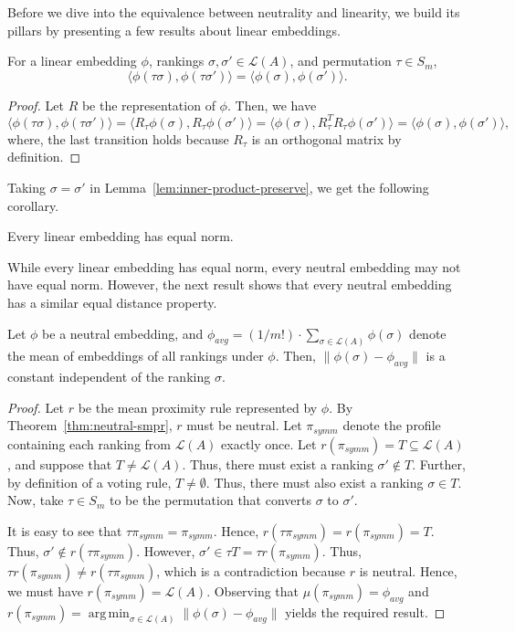 \documentclass[prodmode,acmec]{ec-acmsmall}
\newcommand{\calL}{{\mathcal{L}}}
\newcommand{\rank}{{\calL(A)}}
\DeclareMathOperator*{\argmin}{arg\,min}
\begin{document}
Before we dive into the equivalence between neutrality and linearity, we build its pillars by presenting a few results about linear embeddings. 
\begin{lemma}
For a linear embedding $\phi$, rankings $\sigma,\sigma' \in \rank$, and permutation $\tau \in S_m$, 
$$
\langle \phi(\tau \sigma), \phi(\tau \sigma') \rangle = \langle \phi(\sigma), \phi(\sigma') \rangle.
$$
\label{lem:inner-product-preserve}
\end{lemma}
\begin{proof}
Let $R$ be the representation of $\phi$. Then, we have 
\begin{equation}
\langle \phi(\tau \sigma), \phi(\tau \sigma') \rangle = \langle R_{\tau}\phi(\sigma), R_{\tau}\phi(\sigma') \rangle = \langle \phi(\sigma), R_{\tau}^T R_{\tau}\phi(\sigma') \rangle = \langle \phi(\sigma), \phi(\sigma') \rangle,
\label{eqn:linear-inner-product}
\end{equation}
where, the last transition holds because $R_{\tau}$ is an orthogonal matrix by definition. 
\end{proof}

Taking $\sigma = \sigma'$ in Lemma~\ref{lem:inner-product-preserve}, we get the following corollary.
\begin{corollary}
Every linear embedding has equal norm.
\label{cor:linear-equal-norm}
\end{corollary}

While every linear embedding has equal norm, every neutral embedding may not have equal norm. However, the next result shows that every neutral embedding has a similar equal distance property. 

\begin{lemma}
Let $\phi$ be a neutral embedding, and $\phi_{avg} = (1/m!) \cdot \sum_{\sigma \in \rank} \phi(\sigma)$ denote the mean of embeddings of all rankings under $\phi$. Then, $\|\phi(\sigma)-\phi_{avg}\|$ is a constant independent of the ranking $\sigma$.
\label{lem:average-all}
\end{lemma}
\begin{proof}
Let $r$ be the mean proximity rule represented by $\phi$. By Theorem~\ref{thm:neutral-smpr}, $r$ must be neutral. Let $\pi_{symm}$ denote the profile containing each ranking from $\rank$ exactly once. Let $r(\pi_{symm}) = T \subseteq \rank$, and suppose that $T \neq \rank$. Thus, there must exist a ranking $\sigma' \notin T$. Further, by definition of a voting rule, $T \neq \emptyset$. Thus, there must also exist a ranking $\sigma \in T$. Now, take $\tau \in S_m$ to be the permutation that converts $\sigma$ to $\sigma'$. 

It is easy to see that $\tau \pi_{symm} = \pi_{symm}$. Hence, $r(\tau \pi_{symm}) = r(\pi_{symm}) = T$. Thus, $\sigma' \notin r(\tau \pi_{symm})$. However, $\sigma' \in \tau T = \tau r(\pi_{symm})$. Thus, $\tau r(\pi_{symm}) \neq r(\tau \pi_{symm})$, which is a contradiction because $r$ is neutral. Hence, we must have $r(\pi_{symm}) = \rank$. Observing that $\mu(\pi_{symm}) = \phi_{avg}$ and $r(\pi_{symm}) = \argmin_{\sigma \in \rank} \|\phi(\sigma)-\phi_{avg}\|$ yields the required result.
\end{proof}
\end{document}

